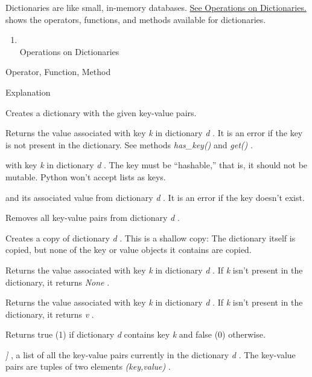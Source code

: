 Dictionaries are like small,
in-memory databases. \href{chap2.html\#13000}{See Operations on
Dictionaries.} shows the operators, functions, and methods available for
dictionaries.

\begin{enumerate}

\item
  \\
  Operations on Dictionaries
\end{enumerate}

Operator, Function, Method

Explanation



Creates a dictionary with the given
key-value pairs.



Returns the value associated with
key \emph{k} in dictionary \emph{d} . It is an error if the key is not
present in the dictionary. See methods \emph{has\_key()} and
\emph{get()} .



 with key
\emph{k} in dictionary \emph{d} . The key must be ``hashable,'' that is,
it should not be mutable. Python won't accept lists as keys.



 and its
associated value from dictionary \emph{d} . It is an error if the key
doesn't exist.



Removes all key-value pairs from
dictionary \emph{d} .



Creates a copy of dictionary
\emph{d} . This is a shallow copy: The dictionary itself is copied, but
none of the key or value objects it contains are copied.



Returns the value associated with
key \emph{k} in dictionary \emph{d} . If \emph{k} isn't present in the
dictionary, it returns \emph{None} .



Returns the value associated with
key \emph{k} in dictionary \emph{d} . If \emph{k} isn't present in the
dictionary, it returns \emph{v} .



Returns true (1) if dictionary
\emph{d} contains key \emph{k} and false (0) otherwise.




\emph{{]}} , a list of all the key-value pairs currently in the
dictionary \emph{d} . The key-value pairs are tuples of two elements
\emph{(key,value)} .



